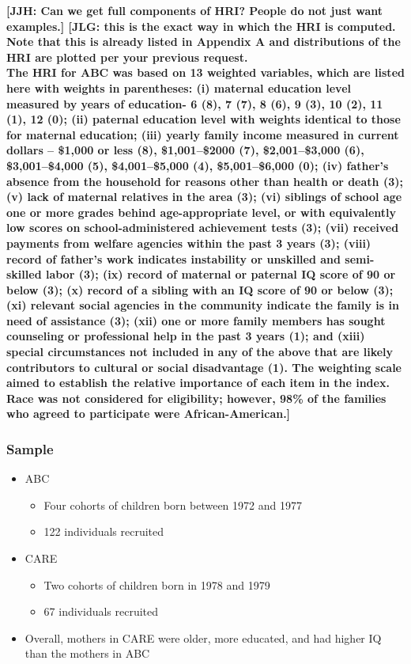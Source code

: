 \documentclass[static]{JJH-Beamer}
\begin{document}
\textbf{[JJH: Can we get full components of HRI? People do not just want examples.] [JLG: this is the exact way in which the HRI is computed. Note that this is already listed in Appendix A and distributions of the HRI are plotted per your previous request.\\
The HRI for ABC was based on 13 weighted variables, which are listed here with weights in parentheses: (i) maternal education level measured by years of education- 6 (8), 7 (7), 8 (6), 9 (3), 10 (2), 11 (1), 12 (0); (ii) paternal education level with weights identical to those for maternal education; (iii) yearly family income measured in current dollars -- \$1,000 or less (8), \$1,001--\$2000 (7), \$2,001--\$3,000 (6), \$3,001--\$4,000 (5), \$4,001--\$5,000 (4), \$5,001--\$6,000 (0); (iv) father's absence from the household for reasons other than health or death (3); (v) lack of maternal relatives in the area (3); (vi) siblings of school age one or more grades behind age-appropriate level, or with equivalently low scores on school-administered achievement tests (3); (vii) received payments from welfare agencies within the past 3 years (3); (viii) record of father's work indicates instability or unskilled and semi-skilled labor (3); (ix) record of maternal or paternal IQ score of 90 or below (3); (x) record of a sibling with an IQ score of 90 or below (3); (xi) relevant social agencies in the community indicate the family is in need of assistance (3); (xii) one or more family members has sought counseling or professional help in the past 3 years (1); and (xiii) special circumstances not included in any of the above that are likely contributors to cultural or social disadvantage (1). The weighting scale aimed to establish the relative importance of each item in the index. Race was not considered for eligibility; however, 98\% of the families who agreed to participate were African-American.]}

\clearpage
\begin{frame}
\frametitle{Sample}\label{sample}

\begin{itemize}
\item ABC
	\begin{itemize}
	\item Four cohorts of children born between 1972 and 1977
	\item 122 individuals recruited
	\end{itemize}
\item CARE
	\begin{itemize}
	\item Two cohorts of children born in 1978 and 1979
	\item 67 individuals recruited
	\end{itemize}
\item Overall, mothers in CARE were older, more educated, and had higher IQ than the mothers in ABC
\end{itemize}

\end{frame}
\end{document}
